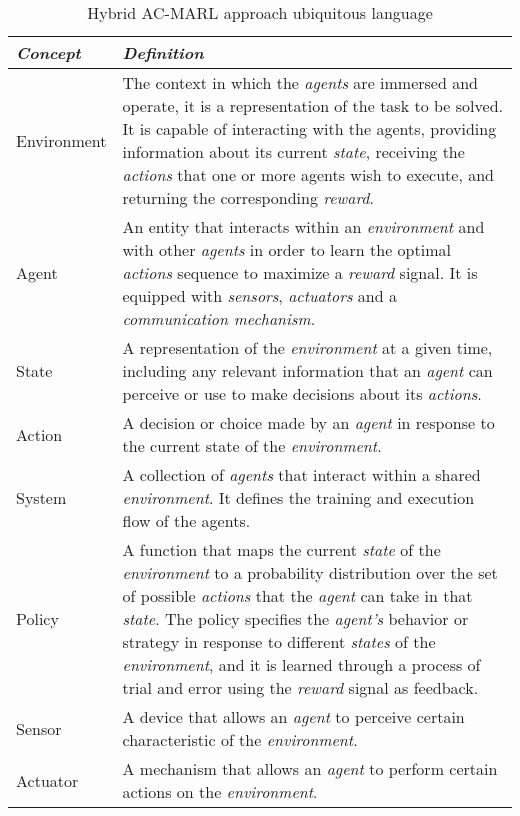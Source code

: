 \begin{table}
    \centering
    \begin{tabularx}{\textwidth}{lX}
        \hline
        \textbf{\emph{Concept}} & \textbf{\emph{Definition}} \\
        \hline
        Environment & The context in which the \emph{agents} are immersed and operate,
                        it is a representation of the task to be solved.
                        It is capable of interacting with the agents, providing information
                        about its current \emph{state}, receiving the \emph{actions} that one or more agents
                        wish to execute, and returning the corresponding \emph{reward}. \\
        \hline
        Agent       & An entity that interacts within an \emph{environment} and with other \emph{agents}
                        in order to learn the optimal \emph{actions} sequence to maximize a \emph{reward} signal. 
                        It is equipped with \emph{sensors}, \emph{actuators} and a \emph{communication mechanism}. \\
        \hline
        State       & A representation of the \emph{environment} at a given time, 
                        including any relevant information that an \emph{agent} can perceive 
                        or use to make decisions about its \emph{actions}. \\
        \hline
        Action      & A decision or choice made by an \emph{agent} in response to the current 
                        state of the \emph{environment}. \\
        \hline
        System      & A collection of \emph{agents} that interact within a shared \emph{environment}. 
                        It defines the training and execution flow of the agents. \\
        \hline
        Policy      & A function that maps the current \emph{state} of the \emph{environment} to a probability 
                        distribution over the set of possible \emph{actions} that the \emph{agent} 
                        can take in that \emph{state}. The policy specifies the \emph{agent's} behavior 
                        or strategy in response to different \emph{states} of the \emph{environment}, 
                        and it is learned through a process of trial and error using the 
                        \emph{reward} signal as feedback. \\
        \hline
        Sensor     & A device that allows an \emph{agent} to perceive certain characteristic of 
                            the \emph{environment}. \\
        \hline
        Actuator   & A mechanism that allows an \emph{agent} to perform certain actions on the 
                            \emph{environment}. \\
        \hline
    \end{tabularx}
    \caption{Hybrid AC-MARL approach ubiquitous language}
    \label{tab:ul}
\end{table}
